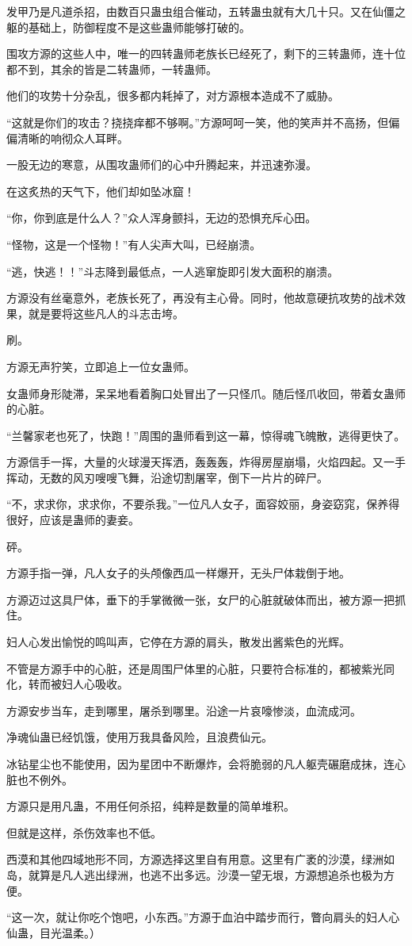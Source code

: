 \begin{this_body}
发甲乃是凡道杀招，由数百只蛊虫组合催动，五转蛊虫就有大几十只。又在仙僵之躯的基础上，防御程度不是这些蛊师能够打破的。

围攻方源的这些人中，唯一的四转蛊师老族长已经死了，剩下的三转蛊师，连十位都不到，其余的皆是二转蛊师，一转蛊师。

他们的攻势十分杂乱，很多都内耗掉了，对方源根本造成不了威胁。

“这就是你们的攻击？挠挠痒都不够啊。”方源呵呵一笑，他的笑声并不高扬，但偏偏清晰的响彻众人耳畔。

一股无边的寒意，从围攻蛊师们的心中升腾起来，并迅速弥漫。

在这炙热的天气下，他们却如坠冰窟！

“你，你到底是什么人？”众人浑身颤抖，无边的恐惧充斥心田。

“怪物，这是一个怪物！”有人尖声大叫，已经崩溃。

“逃，快逃！！”斗志降到最低点，一人逃窜旋即引发大面积的崩溃。

方源没有丝毫意外，老族长死了，再没有主心骨。同时，他故意硬抗攻势的战术效果，就是要将这些凡人的斗志击垮。

刷。

方源无声狞笑，立即追上一位女蛊师。

女蛊师身形陡滞，呆呆地看着胸口处冒出了一只怪爪。随后怪爪收回，带着女蛊师的心脏。

“兰馨家老也死了，快跑！”周围的蛊师看到这一幕，惊得魂飞魄散，逃得更快了。

方源信手一挥，大量的火球漫天挥洒，轰轰轰，炸得房屋崩塌，火焰四起。又一手挥动，无数的风刃嗖嗖飞舞，沿途切割屠宰，倒下一片片的碎尸。

“不，求求你，求求你，不要杀我。”一位凡人女子，面容姣丽，身姿窈窕，保养得很好，应该是蛊师的妻妾。

砰。

方源手指一弹，凡人女子的头颅像西瓜一样爆开，无头尸体栽倒于地。

方源迈过这具尸体，垂下的手掌微微一张，女尸的心脏就破体而出，被方源一把抓住。

妇人心发出愉悦的鸣叫声，它停在方源的肩头，散发出酱紫色的光辉。

不管是方源手中的心脏，还是周围尸体里的心脏，只要符合标准的，都被紫光同化，转而被妇人心吸收。

方源安步当车，走到哪里，屠杀到哪里。沿途一片哀嚎惨淡，血流成河。

净魂仙蛊已经饥饿，使用万我具备风险，且浪费仙元。

冰钻星尘也不能使用，因为星团中不断爆炸，会将脆弱的凡人躯壳碾磨成抹，连心脏也不例外。

方源只是用凡蛊，不用任何杀招，纯粹是数量的简单堆积。

但就是这样，杀伤效率也不低。

西漠和其他四域地形不同，方源选择这里自有用意。这里有广袤的沙漠，绿洲如岛，就算是凡人逃出绿洲，也逃不出多远。沙漠一望无垠，方源想追杀也极为方便。

“这一次，就让你吃个饱吧，小东西。”方源于血泊中踏步而行，瞥向肩头的妇人心仙蛊，目光温柔。）

\end{this_body}

